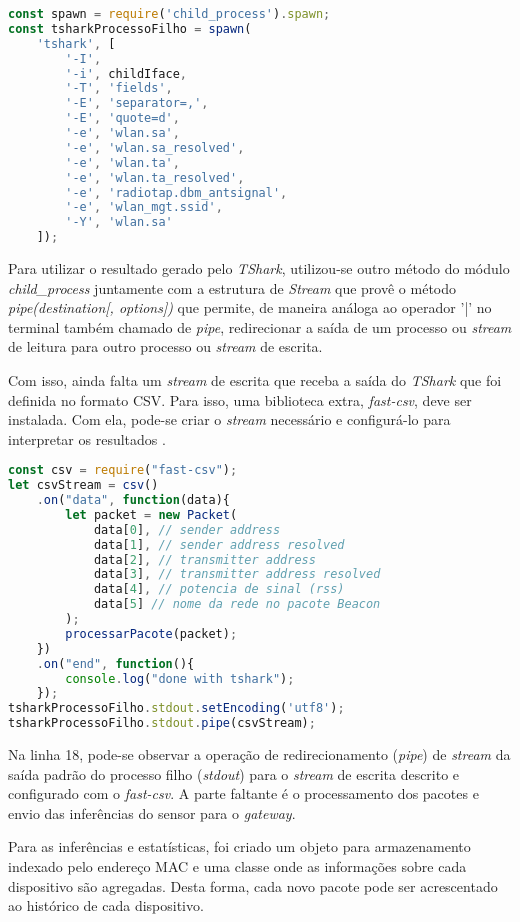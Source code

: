\begin{lstlisting}[language=javascript,caption={TShark e opções executado pelo Node.js},label=code-node-tshark]
const spawn = require('child_process').spawn;
const tsharkProcessoFilho = spawn(
	'tshark', [
		'-I',
		'-i', childIface,
		'-T', 'fields',
		'-E', 'separator=,',
		'-E', 'quote=d',
		'-e', 'wlan.sa',
		'-e', 'wlan.sa_resolved',
		'-e', 'wlan.ta',
		'-e', 'wlan.ta_resolved',
		'-e', 'radiotap.dbm_antsignal',
		'-e', 'wlan_mgt.ssid',
		'-Y', 'wlan.sa'
	]);
\end{lstlisting}

Para utilizar o resultado gerado pelo \emph{TShark}, utilizou-se outro método do
módulo \emph{child\_process} juntamente com a estrutura de \emph{Stream}
\cite{stream} que provê o método \emph{pipe(destination[, options])} que permite,
de maneira análoga ao operador '|' no terminal também chamado de \emph{pipe},
redirecionar a saída de um processo ou \emph{stream} de leitura para outro
processo ou \emph{stream} de escrita.

Com isso, ainda falta um \emph{stream} de escrita que receba a saída do
\emph{TShark} que foi definida no formato CSV. Para isso, uma biblioteca extra,
\emph{fast-csv}, deve ser instalada. Com ela, pode-se criar o \emph{stream}
necessário e configurá-lo para interpretar os resultados \cite{fast-csv}.

\begin{lstlisting}[language=javascript,caption={Uso do fast-csv},label=code-node-csv]
const csv = require("fast-csv");
let csvStream = csv()
	.on("data", function(data){
		let packet = new Packet(
			data[0], // sender address
			data[1], // sender address resolved
			data[2], // transmitter address
			data[3], // transmitter address resolved
			data[4], // potencia de sinal (rss)
			data[5] // nome da rede no pacote Beacon
		);
		processarPacote(packet);
	})
	.on("end", function(){
		console.log("done with tshark");
	});
tsharkProcessoFilho.stdout.setEncoding('utf8');
tsharkProcessoFilho.stdout.pipe(csvStream);
\end{lstlisting}

Na linha 18, pode-se observar a operação de redirecionamento (\emph{pipe})
de \emph{stream} da saída padrão do processo filho (\emph{stdout}) para o
\emph{stream} de escrita descrito e configurado com o \emph{fast-csv}. A parte
faltante é o processamento dos pacotes e envio das inferências do sensor para o
\emph{gateway}.

Para as inferências e estatísticas, foi criado um objeto para armazenamento indexado
pelo endereço MAC e uma classe onde as informações
sobre cada dispositivo são agregadas. Desta forma, cada novo pacote pode ser acrescentado ao
histórico de cada dispositivo.


